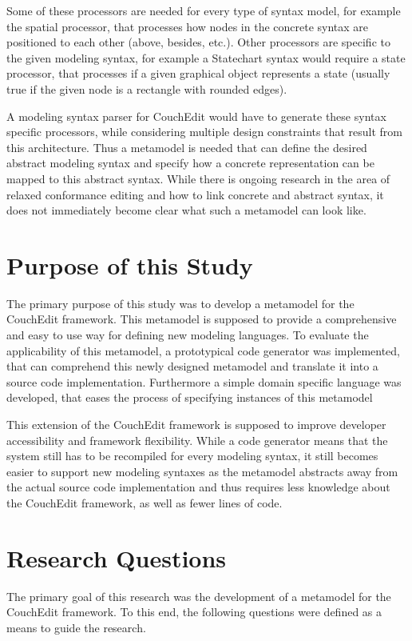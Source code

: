 Some of these processors are needed for every type of syntax model, for example the spatial processor, that processes how nodes in the concrete syntax are positioned to each other (above, besides, etc.). Other processors are specific to the given modeling syntax, for example a Statechart syntax would require a state processor, that processes if a given graphical object represents a state (usually true if the given node is a rectangle with rounded edges).

A modeling syntax parser for CouchEdit would have to generate these syntax specific processors, while considering multiple design constraints that result from this architecture. Thus a metamodel is needed that can define the desired abstract modeling syntax and specify how a concrete representation can be mapped to this abstract syntax. While there is ongoing research in the area of relaxed conformance editing and how to link concrete and abstract syntax, it does not immediately become clear what such a metamodel can look like.

\section{Purpose of this Study}
The primary purpose of this study was to develop a metamodel for the CouchEdit framework. This metamodel is supposed to provide a comprehensive and easy to use way for defining new modeling languages. To evaluate the applicability of this metamodel, a prototypical code generator was implemented, that can comprehend this newly designed metamodel and translate it into a source code implementation. Furthermore a simple domain specific language was developed, that eases the process of specifying instances of this metamodel

This extension of the CouchEdit framework is supposed to improve developer accessibility and framework flexibility. While a code generator means that the system still has to be recompiled for every modeling syntax, it still becomes easier to support new modeling syntaxes as the metamodel abstracts away from the actual source code implementation and thus requires less knowledge about the CouchEdit framework, as well as fewer lines of code.


\section{Research Questions}
The primary goal of this research was the development of a metamodel for the CouchEdit framework. To this end, the following questions were defined as a means to guide the research.

